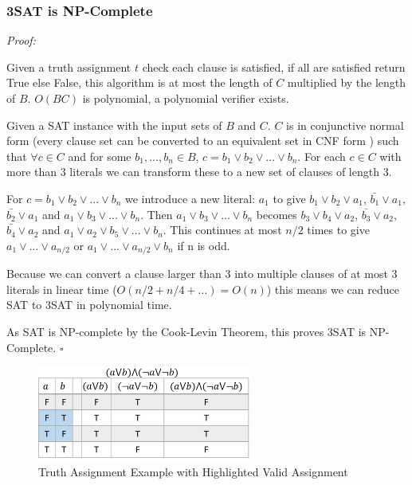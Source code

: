 \documentclass[a4paper,12pt]{article}
\begin{document}
\subsubsection{3SAT is NP-Complete}

\textit{Proof:}

Given a truth assignment $t$ check each clause is satisfied, if all are satisfied return True else False, this algorithm is at most the length of $C$ multiplied by the length of $B$. $O(BC)$ is polynomial, a polynomial verifier exists. 

Given a SAT instance with the input sets of $B$ and $C$. $C$ is in conjunctive normal form (every clause set can be converted to an equivalent set in CNF form \cite{CNF}) such that $\forall c \in C$ and for some $b_1, ... ,b_n \in B$, $c = b_1 \lor b_2 \lor ... \lor b_n$. For each $c \in C$ with more than 3 literals we can transform these to a new set of clauses of length 3. 

For $c = b_1 \lor b_2 \lor ... \lor b_n$ we introduce a new literal: $a_1$ to give $b_1 \lor b_2 \lor a_1$, $\bar{b_1} \lor a_1$, $\bar{b_2} \lor a_1$ and $a_1 \lor b_3 \lor ... \lor b_n$. Then $a_1 \lor b_3 \lor ... \lor b_n$ becomes $b_3 \lor b_4 \lor a_2$, $\bar{b_3} \lor a_2$, $\bar{b_4} \lor a_2$ and $a_1 \lor a_2 \lor b_5 \lor ... \lor b_n$. This continues at most $n/2$ times to give $a_1 \lor ... \lor a_{n/2}$ or $a_1 \lor ... \lor a_{n/2} \lor b_n$ if n is odd. 

Because we can convert a clause larger than 3 into multiple clauses of at most 3 literals in linear time ($O(n/2 + n/4 + ...) = O(n)$) this means we can reduce SAT to 3SAT in polynomial time. 

As SAT is NP-complete by the Cook-Levin Theorem, this proves 3SAT is NP-Complete. $\square$
		
\begin{figure}
\begin{center}
		\includegraphics[width=70mm]{figures/sat_example.png}
\end{center}
		\caption{Truth Assignment Example with Highlighted Valid Assignment}
\end{figure}
\end{document}
